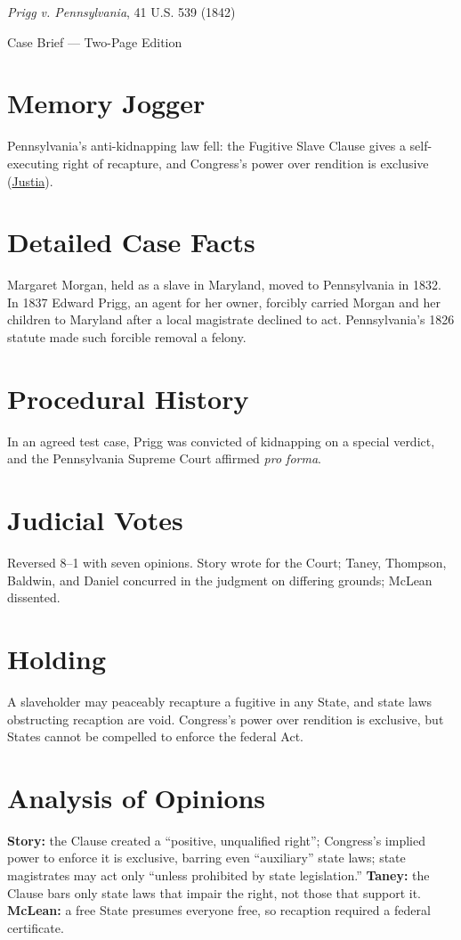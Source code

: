 \documentclass[12pt]{article}
\begin{document}
\begin{center}
{\LARGE \textit{Prigg v. Pennsylvania}, 41 U.S. 539 (1842)\par}
\vspace{0.5em}
{\large Case Brief --- Two-Page Edition\par}
\end{center}

\section{Memory Jogger}
Pennsylvania's anti-kidnapping law fell: the Fugitive Slave Clause gives a self-executing right of recapture, and Congress's power over rendition is exclusive (\href{https://supreme.justia.com/cases/federal/us/41/539/}{Justia}).

\section{Detailed Case Facts}
Margaret Morgan, held as a slave in Maryland, moved to Pennsylvania in 1832. In 1837 Edward Prigg, an agent for her owner, forcibly carried Morgan and her children to Maryland after a local magistrate declined to act. Pennsylvania's 1826 statute made such forcible removal a felony.

\section{Procedural History}
In an agreed test case, Prigg was convicted of kidnapping on a special verdict, and the Pennsylvania Supreme Court affirmed \textit{pro forma}.

\section{Judicial Votes}
Reversed 8--1 with seven opinions. Story wrote for the Court; Taney, Thompson, Baldwin, and Daniel concurred in the judgment on differing grounds; McLean dissented.

\section{Holding}
A slaveholder may peaceably recapture a fugitive in any State, and state laws obstructing recaption are void. Congress's power over rendition is exclusive, but States cannot be compelled to enforce the federal Act.

\section{Analysis of Opinions}
\textbf{Story:} the Clause created a ``positive, unqualified right''; Congress's implied power to enforce it is exclusive, barring even ``auxiliary'' state laws; state magistrates may act only ``unless prohibited by state legislation.'' \textbf{Taney:} the Clause bars only state laws that impair the right, not those that support it. \textbf{McLean:} a free State presumes everyone free, so recaption required a federal certificate.
\end{document}
